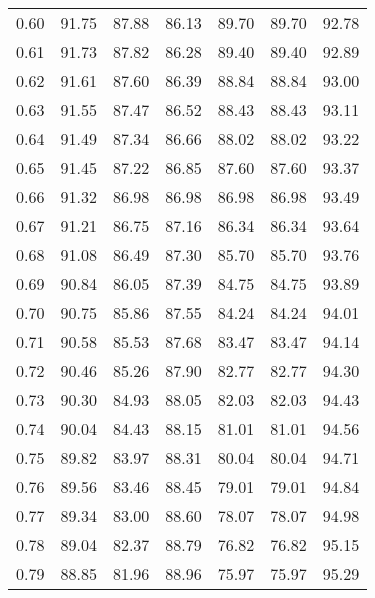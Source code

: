 \begin{tabular}{|c|c|c|c|c|c|c|}
      0.60 &     91.75 &     87.88 &      86.13 &   89.70 &      89.70 &         92.78 \\
      0.61 &     91.73 &     87.82 &      86.28 &   89.40 &      89.40 &         92.89 \\
      0.62 &     91.61 &     87.60 &      86.39 &   88.84 &      88.84 &         93.00 \\
      0.63 &     91.55 &     87.47 &      86.52 &   88.43 &      88.43 &         93.11 \\
      0.64 &     91.49 &     87.34 &      86.66 &   88.02 &      88.02 &         93.22 \\
      0.65 &     91.45 &     87.22 &      86.85 &   87.60 &      87.60 &         93.37 \\
      0.66 &     91.32 &     86.98 &      86.98 &   86.98 &      86.98 &         93.49 \\
      0.67 &     91.21 &     86.75 &      87.16 &   86.34 &      86.34 &         93.64 \\
      0.68 &     91.08 &     86.49 &      87.30 &   85.70 &      85.70 &         93.76 \\
      0.69 &     90.84 &     86.05 &      87.39 &   84.75 &      84.75 &         93.89 \\
      0.70 &     90.75 &     85.86 &      87.55 &   84.24 &      84.24 &         94.01 \\
      0.71 &     90.58 &     85.53 &      87.68 &   83.47 &      83.47 &         94.14 \\
      0.72 &     90.46 &     85.26 &      87.90 &   82.77 &      82.77 &         94.30 \\
      0.73 &     90.30 &     84.93 &      88.05 &   82.03 &      82.03 &         94.43 \\
      0.74 &     90.04 &     84.43 &      88.15 &   81.01 &      81.01 &         94.56 \\
      0.75 &     89.82 &     83.97 &      88.31 &   80.04 &      80.04 &         94.71 \\
      0.76 &     89.56 &     83.46 &      88.45 &   79.01 &      79.01 &         94.84 \\
      0.77 &     89.34 &     83.00 &      88.60 &   78.07 &      78.07 &         94.98 \\
      0.78 &     89.04 &     82.37 &      88.79 &   76.82 &      76.82 &         95.15 \\
      0.79 &     88.85 &     81.96 &      88.96 &   75.97 &      75.97 &         95.29 \\

\end{tabular}
